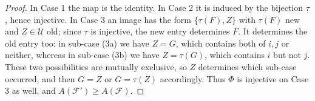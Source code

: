 \documentclass[10pt,a4paper]{amsart}
\newcommand{\F}{\mathcal{F}}
\newcommand{\Uu}{\mathcal{U}}
\begin{document}
\begin{proof}
In Case 1 the map is the identity. In Case 2 it is induced by the bijection $\tau$, hence injective.
In Case 3 an image has the form $\{\tau(F),Z\}$ with $\tau(F)$ new and $Z\in\Uu$ old; since $\tau$ is
injective, the new entry determines $F$. It determines the old entry too: in sub-case (3a) we have
$Z=G$, which contains both of $i,j$ or neither, whereas in sub-case (3b) we have $Z=\tau(G)$, which
contains $i$ but not $j$. These two possibilities are mutually exclusive, so $Z$ determines which
sub-case occurred, and then $G=Z$ or $G=\tau(Z)$ accordingly. Thus $\Phi$ is injective on Case 3 as
well, and $A(\F')\ge A(\F)$.
\end{proof}
\end{document}
